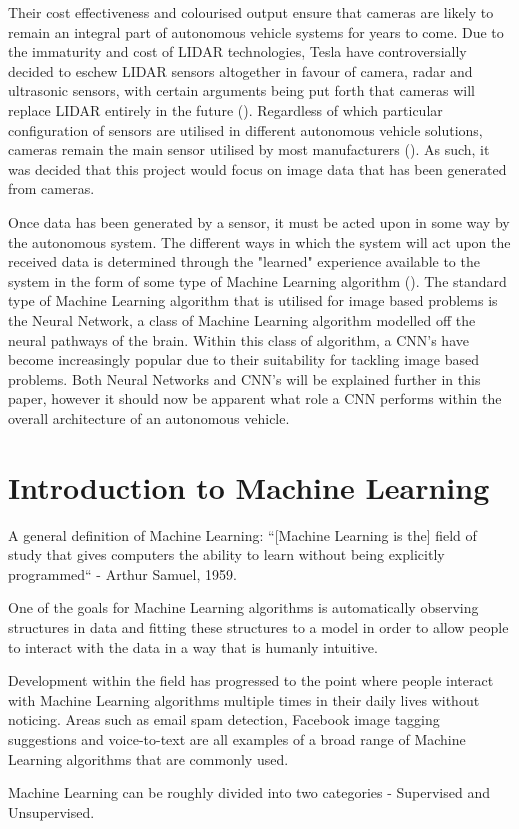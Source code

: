 \documentclass[12pt]{report}
\begin{document}
\begin{flushleft}
\vspace{0.5cm}
Their cost effectiveness and colourised output ensure that cameras are likely to remain an integral part of autonomous vehicle systems for years to come. Due to the immaturity and cost of LIDAR technologies, Tesla have controversially decided to eschew LIDAR sensors altogether in favour of camera, radar and ultrasonic sensors, with certain arguments being put forth that cameras will replace LIDAR entirely in the future (\cite{harris2015cheaper}). Regardless of which particular configuration of sensors are utilised in different autonomous vehicle solutions, cameras remain the main sensor utilised by most manufacturers (\cite{kocic2018sensors}). As such, it was decided that this project would focus on image data that has been generated from cameras.
\end{flushleft}

\vspace{0.5cm}
\begin{flushleft}
Once data has been generated by a sensor, it must be acted upon in some way by the autonomous system. The different ways in which the system will act upon the received data is determined through the "learned" experience available to the system in the form of some type of Machine Learning algorithm (\cite{surden2016technological}). The standard type of Machine Learning algorithm that is utilised for image based problems is the Neural Network, a class of Machine Learning algorithm modelled off the neural pathways of the brain. Within this class of algorithm, a CNN's have become increasingly popular due to their suitability for tackling image based problems. Both Neural Networks and CNN's will be explained further in this paper, however it should now be apparent what role a CNN performs within the overall architecture of an autonomous vehicle.
\end{flushleft}

\section{Introduction to Machine Learning}
\begin{flushleft}
A general definition of Machine Learning:
``[Machine Learning is the] field of study that gives computers the ability to learn without being explicitly programmed`` - Arthur Samuel, 1959.

One of the goals for Machine Learning algorithms is automatically observing structures in data and fitting these structures to a model in order to allow people to interact with the data in a way that is humanly intuitive.

Development within the field has progressed to the point where people interact with Machine Learning algorithms multiple times in their daily lives without noticing. Areas such as email spam detection, Facebook image tagging suggestions and voice-to-text are all examples of a broad range of Machine Learning algorithms that are commonly used.

Machine Learning can be roughly divided into two categories - Supervised and Unsupervised. 
\end{flushleft}
\end{document}

